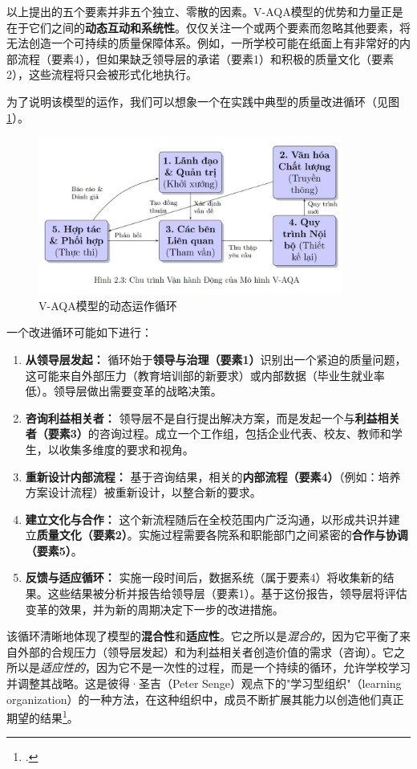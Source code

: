 以上提出的五个要素并非五个独立、零散的因素。V-AQA模型的优势和力量正是在于它们之间的\textbf{动态互动和系统性}。仅仅关注一个或两个要素而忽略其他要素，将无法创造一个可持续的质量保障体系。例如，一所学校可能在纸面上有非常好的内部流程（要素4），但如果缺乏领导层的承诺（要素1）和积极的质量文化（要素2），这些流程将只会被形式化地执行。

为了说明该模型的运作，我们可以想象一个在实践中典型的质量改进循环（见图\ref{fig:v-aqa-cycle}）。

\begin{figure}[h!]
    \centering
    \includegraphics[width=0.9\textwidth]{image/chu_trinh_van_hanh_V-AQA.jpg}
    \caption{V-AQA模型的动态运作循环}
    \label{fig:v-aqa-cycle}
\end{figure}


一个改进循环可能如下进行：
\begin{enumerate}
    \item \textbf{从领导层发起：} 循环始于\textbf{领导与治理（要素1）}识别出一个紧迫的质量问题，这可能来自外部压力（教育培训部的新要求）或内部数据（毕业生就业率低）。领导层做出需要变革的战略决策。
    \item \textbf{咨询利益相关者：} 领导层不是自行提出解决方案，而是发起一个与\textbf{利益相关者（要素3）}的咨询过程。成立一个工作组，包括企业代表、校友、教师和学生，以收集多维度的要求和视角。
    \item \textbf{重新设计内部流程：} 基于咨询结果，相关的\textbf{内部流程（要素4）}（例如：培养方案设计流程）被重新设计，以整合新的要求。
    \item \textbf{建立文化与合作：} 这个新流程随后在全校范围内广泛沟通，以形成共识并建立\textbf{质量文化（要素2）}。实施过程需要各院系和职能部门之间紧密的\textbf{合作与协调（要素5）}。
    \item \textbf{反馈与适应循环：} 实施一段时间后，数据系统（属于要素4）将收集新的结果。这些结果被分析并报告给领导层（要素1）。基于这份报告，领导层将评估变革的效果，并为新的周期决定下一步的改进措施。
\end{enumerate}
该循环清晰地体现了模型的\textbf{混合性}和\textbf{适应性}。它之所以是\textit{混合的}，因为它平衡了来自外部的合规压力（领导层发起）和为利益相关者创造价值的需求（咨询）。它之所以是\textit{适应性的}，因为它不是一次性的过程，而是一个持续的循环，允许学校学习并调整其战略。这是彼得·圣吉（Peter Senge）观点下的"学习型组织"（learning organization）的一种方法，在这种组织中，成员不断扩展其能力以创造他们真正期望的结果\footcite{Senge2006}。

